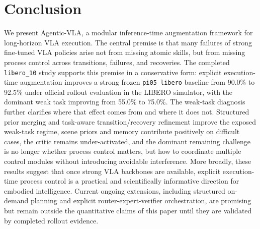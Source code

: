 \documentclass[a4paper]{Template/LaTeX_Templates/waica}
\begin{document}
\section{Conclusion}

We present Agentic-VLA, a modular inference-time augmentation framework for long-horizon VLA execution. The central premise is that many failures of strong fine-tuned VLA policies arise not from missing atomic skills, but from missing process control across transitions, failures, and recoveries. The completed \texttt{libero\_10} study supports this premise in a conservative form: explicit execution-time augmentation improves a strong frozen \texttt{pi05\_libero} baseline from 90.0\% to 92.5\% under official rollout evaluation in the LIBERO simulator, with the dominant weak task improving from 55.0\% to 75.0\%. The weak-task diagnosis further clarifies where that effect comes from and where it does not. Structured prior merging and task-aware transition/recovery refinement improve the exposed weak-task regime, scene priors and memory contribute positively on difficult cases, the critic remains under-activated, and the dominant remaining challenge is no longer whether process control matters, but how to coordinate multiple control modules without introducing avoidable interference. More broadly, these results suggest that once strong VLA backbones are available, explicit execution-time process control is a practical and scientifically informative direction for embodied intelligence. Current ongoing extensions, including structured on-demand planning and explicit router-expert-verifier orchestration, are promising but remain outside the quantitative claims of this paper until they are validated by completed rollout evidence.
\end{document}
